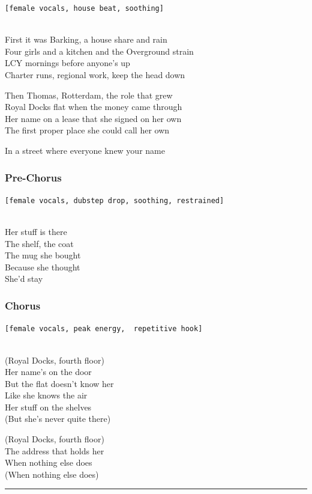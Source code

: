 \documentclass[]{article}
\begin{document}
\texttt{{[}female\ vocals,\ house\ beat,\ soothing{]}}\strut \\
First it was Barking, a house share and rain\\
Four girls and a kitchen and the Overground strain\\
LCY mornings before anyone's up\\
Charter runs, regional work, keep the head down

Then Thomas, Rotterdam, the role that grew\\
Royal Docks flat when the money came through\\
Her name on a lease that she signed on her own\\
The first proper place she could call her own

In a street where everyone knew your name

\subsubsection{Pre-Chorus}\label{pre-chorus-55}

\texttt{{[}female\ vocals,\ dubstep\ drop,\ soothing,\ restrained{]}}\strut \\
Her stuff is there\\
The shelf, the coat\\
The mug she bought\\
Because she thought\\
She'd stay

\subsubsection{Chorus}\label{chorus-83}

\texttt{{[}female\ vocals,\ peak\ energy,\ \ repetitive\ hook{]}}\strut \\
(Royal Docks, fourth floor)\\
Her name's on the door\\
But the flat doesn't know her\\
Like she knows the air\\
Her stuff on the shelves\\
(But she's never quite there)

(Royal Docks, fourth floor)\\
The address that holds her\\
When nothing else does\\
(When nothing else does)

\begin{center}\rule{0.5\linewidth}{0.5pt}\end{center}
\end{document}
